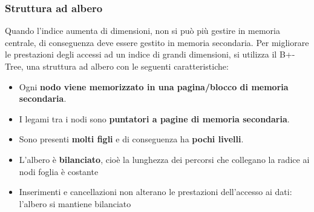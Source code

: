 \documentclass[a4paper]{article}
\begin{document}
\subsubsection{Struttura ad albero}
Quando l'indice aumenta di dimensioni, non si può più gestire in memoria centrale,
di conseguenza deve essere gestito in memoria secondaria. Per migliorare le prestazioni
degli accessi ad un indice di grandi dimensioni, si utilizza il B+-Tree, una struttura
ad albero con le seguenti caratteristiche:
\begin{itemize}
  \item Ogni \textbf{nodo viene memorizzato in una pagina/blocco di memoria secondaria}.

  \item I legami tra i nodi sono \textbf{puntatori a pagine di memoria secondaria}.

  \item Sono presenti \textbf{molti figli} e di conseguenza ha \textbf{pochi livelli}.

  \item L'albero è \textbf{bilanciato}, cioè la lunghezza dei percorsi che collegano
    la radice ai nodi foglia è costante

  \item Inserimenti e cancellazioni non alterano le prestazioni dell’accesso ai dati:
    l’albero si mantiene bilanciato
\end{itemize}
\end{document}
